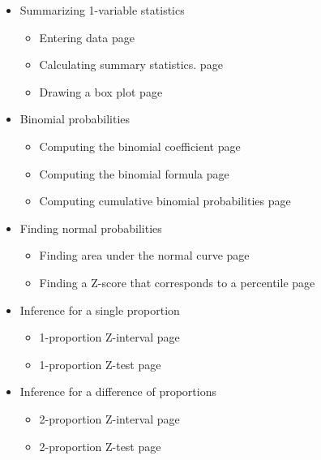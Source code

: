 \begin{itemize}
\item[]  Summarizing 1-variable statistics 

\begin{itemize}\vspace{-1mm}
\setlength{\itemsep}{0mm}
\item[] Entering data \hfill page~\pageref{summarizedata}
\item[] Calculating summary statistics. \hfill page~\pageref{summstat}
\item[] Drawing a box plot \hfill page~\pageref{boxplot}
\end{itemize}

\item[] Binomial probabilities
\begin{itemize}\vspace{-1mm}
\setlength{\itemsep}{0mm}
\item[] Computing the binomial coefficient \hfill page~\pageref{calculatorBinomial}
\item[] Computing the binomial formula \hfill page~\pageref{binomialformula}
\item[] Computing cumulative binomial probabilities \hfill page~\pageref{binomialcumulative}
\end{itemize}

\item[] Finding normal probabilities
\begin{itemize}\vspace{-1mm}
\setlength{\itemsep}{0mm}
\item[] Finding area under the normal curve  \hfill page~\pageref{normal}
\item[] Finding a Z-score that corresponds to a percentile  \hfill page~\pageref{invNorm}
\end{itemize}


\item[]  Inference for a single proportion

\begin{itemize}\vspace{-1mm}
\setlength{\itemsep}{0mm}
\item[] 1-proportion Z-interval \hfill page~\pageref{1PropZInt}
\item[] 1-proportion Z-test \hfill page~\pageref{1propZtest}
\end{itemize}

\item[] Inference for a difference of proportions
\begin{itemize}\vspace{-1mm}
\setlength{\itemsep}{0mm}
\item[] 2-proportion Z-interval \hfill page~\pageref{2propZint}
\item[] 2-proportion Z-test \hfill page~\pageref{2propZtest}
\end{itemize}



\end{itemize}
